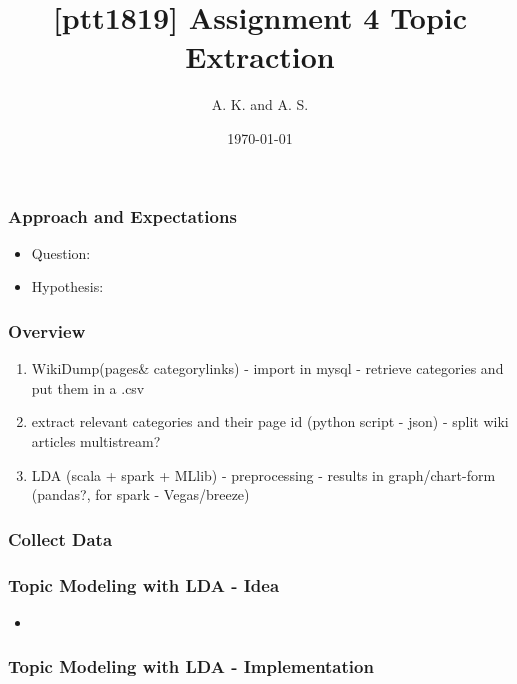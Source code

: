 \documentclass{beamer}
\title{[ptt1819] Assignment 4 \newline
Topic Extraction}
\author{A. K. and A. S.}
\date{\today}
\begin{document}
\frame{\titlepage} 


\begin{frame}[fragile]
   \frametitle{Approach and Expectations}

      \begin{itemize}
         \item Question: 
         \item Hypothesis:
      \end{itemize}
\end{frame}


\begin{frame}[fragile]
	\frametitle{Overview}

		\begin{enumerate}
         \Large
         \item WikiDump(pages\& categorylinks) - import in mysql - retrieve categories and put them in a .csv
         \item extract relevant categories and their page id (python script - json) -  split wiki articles multistream?
         \item LDA (scala + spark + MLlib) - preprocessing - results in graph/chart-form (pandas?, for spark - Vegas/breeze)
   		\end{enumerate}
\end{frame}


\begin{frame}[fragile]
   \frametitle{Collect Data}

\end{frame}


\begin{frame}[fragile]
	\frametitle{Topic Modeling with LDA - Idea}

		\begin{itemize}
         \item 
   	\end{itemize}
\end{frame}


\begin{frame}[fragile]
   \frametitle{Topic Modeling with LDA - Implementation}

\end{frame}
\end{document}
